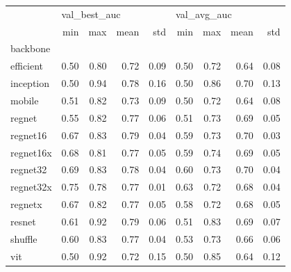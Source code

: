 \begin{tabular}{lrrrrrrrr}
\toprule
{} & \multicolumn{4}{l}{val\_best\_auc} & \multicolumn{4}{l}{val\_avg\_auc} \\
{} &          min &   max &  mean &   std &         min &   max &  mean &   std \\
backbone  &              &       &       &       &             &       &       &       \\
\midrule
efficient &         0.50 &  0.80 &  0.72 &  0.09 &        0.50 &  0.72 &  0.64 &  0.08 \\
inception &         0.50 &  0.94 &  0.78 &  0.16 &        0.50 &  0.86 &  0.70 &  0.13 \\
mobile    &         0.51 &  0.82 &  0.73 &  0.09 &        0.50 &  0.72 &  0.64 &  0.08 \\
regnet    &         0.55 &  0.82 &  0.77 &  0.06 &        0.51 &  0.73 &  0.69 &  0.05 \\
regnet16  &         0.67 &  0.83 &  0.79 &  0.04 &        0.59 &  0.73 &  0.70 &  0.03 \\
regnet16x &         0.68 &  0.81 &  0.77 &  0.05 &        0.59 &  0.74 &  0.69 &  0.05 \\
regnet32  &         0.69 &  0.83 &  0.78 &  0.04 &        0.60 &  0.73 &  0.70 &  0.04 \\
regnet32x &         0.75 &  0.78 &  0.77 &  0.01 &        0.63 &  0.72 &  0.68 &  0.04 \\
regnetx   &         0.67 &  0.82 &  0.77 &  0.05 &        0.58 &  0.72 &  0.68 &  0.05 \\
resnet    &         0.61 &  0.92 &  0.79 &  0.06 &        0.51 &  0.83 &  0.69 &  0.07 \\
shuffle   &         0.60 &  0.83 &  0.77 &  0.04 &        0.53 &  0.73 &  0.66 &  0.06 \\
vit       &         0.50 &  0.92 &  0.72 &  0.15 &        0.50 &  0.85 &  0.64 &  0.12 \\
\bottomrule
\end{tabular}
